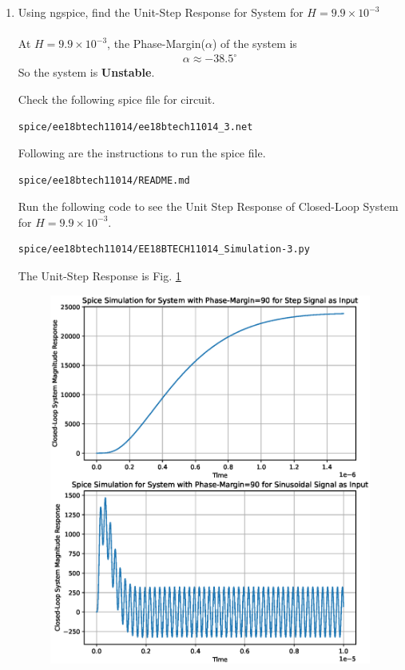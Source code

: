 \begin{enumerate}[label=\thesection.\arabic*.,ref=\thesection.\theenumi]
\item Using ngspice, find the Unit-Step Response for System for $H=9.9\times 10^{-3}$\\
\solution\\
 At $H=9.9\times 10^{-3}$, the Phase-Margin($\alpha$) of the system is
\begin{align}
\alpha \approx -38.5^{\circ}
\end{align}
So the system is \textbf{Unstable}.

Check the following spice file for circuit.
\begin{lstlisting}
spice/ee18btech11014/ee18btech11014_3.net
\end{lstlisting}

Following are the instructions to run the spice file.
\begin{lstlisting}
spice/ee18btech11014/README.md
\end{lstlisting}

Run the following code to see the Unit Step Response of Closed-Loop System for $H=9.9\times 10^{-3}$.
\begin{lstlisting}
spice/ee18btech11014/EE18BTECH11014_Simulation-3.py
\end{lstlisting}

The Unit-Step Response is Fig. \ref{fig:Unstable System}
\begin{figure}[ht!]
	\begin{center}
		\includegraphics[width=\columnwidth]{./figs/ee18btech11014/ee18btech11014_Spice_Result.eps}
	\end{center}
	\caption{}
	\label{fig:Unstable System}
\end{figure}
\end{enumerate}
